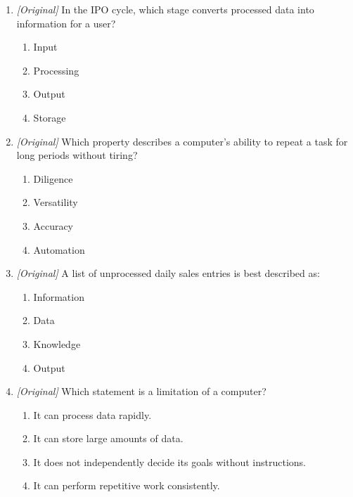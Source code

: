 \begin{enumerate}[label=\textbf{Q\arabic*.}, leftmargin=*]
  \begin{enumerate}[label=\Alph*.]
    \item Input is accepted before processing begins.
    \item Output depends on the input and the instructions used.
    \item Storage is the letter S in the IPO abbreviation.
    \item Processing converts data into information.
  \end{enumerate}
\item \textit{[Original]} In the IPO cycle, which stage converts processed data into information for a user?
  \begin{enumerate}[label=\Alph*.]
\item Input
   \item Processing
   \item Output
   \item Storage
  \end{enumerate}

\item \textit{[Original]} Which property describes a computer's ability to repeat a task for long periods without tiring?
  \begin{enumerate}[label=\Alph*.]
\item Diligence
   \item Versatility
   \item Accuracy
   \item Automation
  \end{enumerate}

\item \textit{[Original]} A list of unprocessed daily sales entries is best described as:
  \begin{enumerate}[label=\Alph*.]
\item Information
   \item Data
   \item Knowledge
   \item Output
  \end{enumerate}

\item \textit{[Original]} Which statement is a limitation of a computer?
  \begin{enumerate}[label=\Alph*.]
\item It can process data rapidly.
   \item It can store large amounts of data.
   \item It does not independently decide its goals without instructions.
   \item It can perform repetitive work consistently.
  \end{enumerate}


\end{enumerate}

